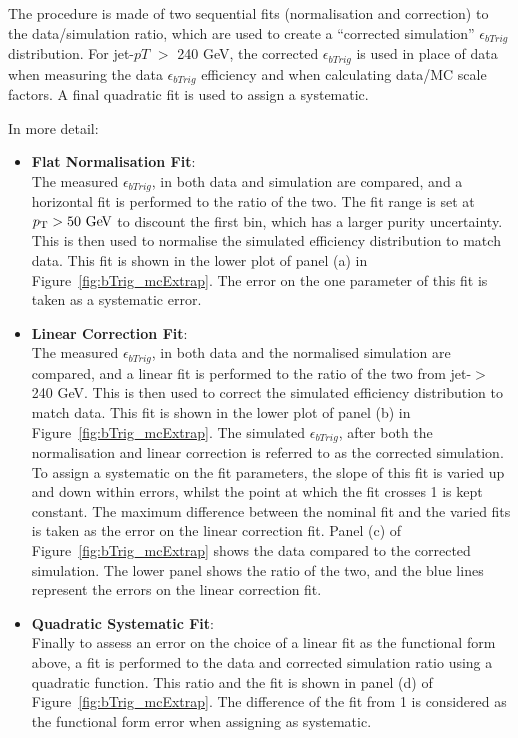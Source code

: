 The procedure is made of two sequential fits (normalisation and correction) to the data/simulation ratio,
which are used to create a ``corrected simulation'' $\epsilon_{bTrig}$ distribution.
For jet-$pT$ $>$ 240 GeV, the corrected $\epsilon_{bTrig}$ is used in place of data when measuring the data $\epsilon_{bTrig}$ efficiency
and when calculating data/MC scale factors.
A final quadratic fit is used to assign a systematic. 

\noindent
In more detail:
\begin{itemize}
  \setlength\itemsep{1em}
\item \textbf{Flat Normalisation Fit}: \\
  The measured $\epsilon_{bTrig}$, in both data and simulation are compared,
  and a horizontal fit is performed to the ratio of the two.
  The fit range is set at $\pT > 50\GeV$ to discount the first bin, which has a larger purity uncertainty.
  This is then used to normalise the simulated efficiency distribution to match data.
  This fit is shown in the lower plot  of panel (a) in Figure~\ref{fig:bTrig_mcExtrap}.
  The error on the one parameter of this fit is taken as a systematic error.
  
\item \textbf{Linear Correction Fit}:  \\
  The measured $\epsilon_{bTrig}$, in both data and the normalised simulation are compared,
  and a linear fit is performed to the ratio of the two from jet-\pT $>$ 240 GeV.
  This is then used to correct the simulated efficiency distribution to match data.
  This fit is shown in the lower plot of panel (b) in Figure~\ref{fig:bTrig_mcExtrap}.
  The simulated $\epsilon_{bTrig}$, after both the normalisation and linear correction is referred to as the corrected simulation.
  To assign a systematic on the fit parameters, the slope of this fit is varied up and down within errors,
  whilst the point at which the fit crosses 1 is kept constant.
  The maximum difference between the nominal fit and the varied fits is taken as the error on the linear correction fit.
  Panel (c) of Figure~\ref{fig:bTrig_mcExtrap} shows the data compared to the corrected simulation.
  The lower panel shows the ratio of the two, and the blue lines represent the errors on the linear correction fit.
  
\item \textbf{Quadratic Systematic Fit}: \\
  Finally to assess an error on the choice of a linear fit as the functional form above,
  a fit is performed to the data and corrected simulation ratio using a quadratic function.
  This ratio and the fit is shown in panel (d) of Figure~\ref{fig:bTrig_mcExtrap}.
  The difference of the fit from 1 is considered as the functional form error when assigning as systematic.
  
\end{itemize}

